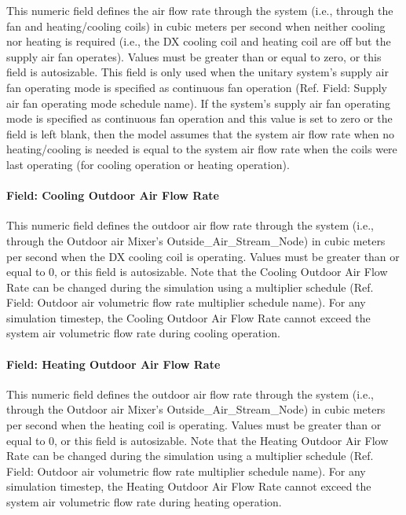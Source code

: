 This numeric field defines the air flow rate through the system (i.e., through the fan and heating/cooling coils) in cubic meters per second when neither cooling nor heating is required (i.e., the DX cooling coil and heating coil are off but the supply air fan operates). Values must be greater than or equal to zero, or this field is autosizable. This field is only used when the unitary system's supply air fan operating mode is specified as continuous fan operation (Ref. Field: Supply air fan operating mode schedule name). If the system's supply air fan operating mode is specified as continuous fan operation and this value is set to zero or the field is left blank, then the model assumes that the system air flow rate when no heating/cooling is needed is equal to the system air flow rate when the coils were last operating (for cooling operation or heating operation).

\paragraph{Field: Cooling Outdoor Air Flow Rate}\label{field-cooling-outdoor-air-flow-rate-000}

This numeric field defines the outdoor air flow rate through the system (i.e., through the Outdoor air Mixer's Outside\_Air\_Stream\_Node) in cubic meters per second when the DX cooling coil is operating. Values must be greater than or equal to 0, or this field is autosizable. Note that the Cooling Outdoor Air Flow Rate can be changed during the simulation using a multiplier schedule (Ref. Field: Outdoor air volumetric flow rate multiplier schedule name). For any simulation timestep, the Cooling Outdoor Air Flow Rate cannot exceed the system air volumetric flow rate during cooling operation.

\paragraph{Field: Heating Outdoor Air Flow Rate}\label{field-heating-outdoor-air-flow-rate-000}

This numeric field defines the outdoor air flow rate through the system (i.e., through the Outdoor air Mixer's Outside\_Air\_Stream\_Node) in cubic meters per second when the heating coil is operating. Values must be greater than or equal to 0, or this field is autosizable. Note that the Heating Outdoor Air Flow Rate can be changed during the simulation using a multiplier schedule (Ref. Field: Outdoor air volumetric flow rate multiplier schedule name). For any simulation timestep, the Heating Outdoor Air Flow Rate cannot exceed the system air volumetric flow rate during heating operation.

